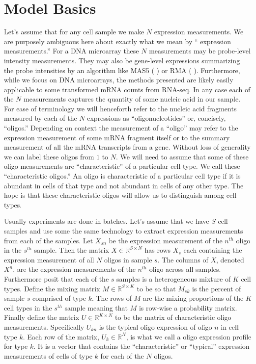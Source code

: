 \documentclass[reqno,12pt,oneside]{report}\usepackage[]{graphicx}\usepackage[]{color}
\renewcommand{\citet}[1]{(\citeauthor{#1} \citeyear{#1})}
\theoremstyle{plain}
\theoremstyle{definition}
\theoremstyle{remark}
\numberwithin{theorem}{chapter}     %
\begin{document}
\section{Model Basics}

Let's assume that for any cell sample we make $N$ expression measurements. We are purposely ambiguous here about exactly what we mean by `` expression measurements.'' For a DNA microarray these $N$ measurements may be probe-level intensity measurements. They may also be gene-level expressions summarizing the probe intensities by an algorithm like MAS5 \citet{Hubbell2002} or RMA \citet{Irizarry2003}. Furthermore, while we focus on DNA microarrays, the methods presented are likely easily applicable to some transformed mRNA counts from RNA-seq. In any case each of the $N$ measurements captures the quantity of some nucleic acid in our sample. For ease of terminology we will henceforth refer to the nucleic acid fragments measured by each of the $N$ expressions as ``oligonucleotides'' or, concisely, ``oligos.'' Depending on context the measurement of a ``oligo'' may refer to the expression measurement of some mRNA fragment itself or to the summary measurement of all the mRNA transcripts from a gene. Without loss of generality we can label these oligos from $1$ to $N$. We will need to assume that some of these oligo measurements are ``characteristic'' of a particular cell type. We call these ``characteristic oligos.'' An oligo is characteristic of a particular cell type if it is abundant in cells of that type and not abundant in cells of any other type. The hope is that these characteristic oligos will allow us to distinguish among cell types. 

Usually experiments are done in batches. Let's assume that we have $S$ cell samples and use some the same technology to extract expression measurements from each of the samples. Let $X_{sn}$ be the expression measurement of the $n^{th}$ oligo in the $s^{th}$ sample. Then the matrix $X\in \mathbb{R}^{S \times N}$ has rows $X_{s}$ each containing the expression measurement of all $N$ oligos in sample $s$. The columns of $X$, denoted $X^n$, are the expression measurements of the $n^{th}$ oligo across all samples. Furthermore posit that each of the $s$ samples is a heterogeneous mixture of $K$ cell types. Define the mixing matrix $M \in \mathbb{R}^{S \times K}$ to be so that $M_{sk}$ is the percent of sample $s$ comprised of type $k$. The rows of $M$ are the mixing proportions of the $K$ cell types in the $s^{th}$ sample meaning that $M$ is row-wise a probability matrix. Finally define the matrix $U \in \mathbb{R}^{K \times N}$ to be the matrix of characteristic oligo measurements. Specifically $U_{kn}$ is the typical oligo expression of oligo $n$ in cell type $k$. Each row of the matrix, $U_{k}\in\mathbb{R}^{N}$, is what we call a oligo expression profile for type $k$. It is a vector that contains the ``characteristic'' or ``typical'' expression measurements of cells of type $k$ for each of the $N$ oligos.
\end{document}

